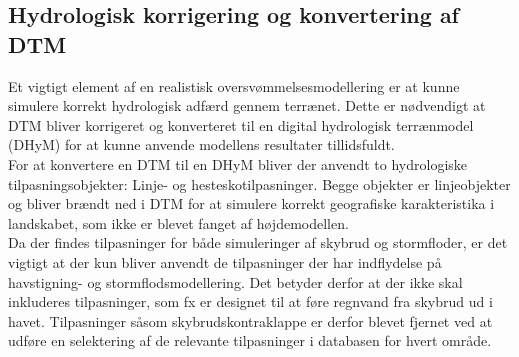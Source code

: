 
\subsection{Hydrologisk korrigering og konvertering af DTM} \label{Sektion: Konvertering af DTM til DHyM}
Et vigtigt element af en realistisk oversvømmelsesmodellering er at kunne simulere korrekt hydrologisk adfærd gennem terrænet. Dette er nødvendigt at DTM bliver korrigeret og konverteret til en digital hydrologisk terrænmodel (DHyM) for at kunne anvende modellens resultater tillidsfuldt.\\ 

For at konvertere en DTM til en DHyM bliver der anvendt to hydrologiske tilpasningsobjekter: Linje- og hesteskotilpasninger. Begge objekter er linjeobjekter og bliver brændt ned i DTM for at simulere korrekt geografiske karakteristika i landskabet, som ikke er blevet fanget af højdemodellen.\\
Da der findes tilpasninger for både simuleringer af skybrud og stormfloder, er det vigtigt at der kun bliver anvendt de tilpasninger der har indflydelse på havstigning- og stormflodsmodellering. Det betyder derfor at der ikke skal inkluderes tilpasninger, som fx er designet til at føre regnvand fra skybrud ud i havet. Tilpasninger såsom skybrudskontraklappe er derfor blevet fjernet ved at udføre en selektering af de relevante tilpasninger i databasen for hvert område.\\

